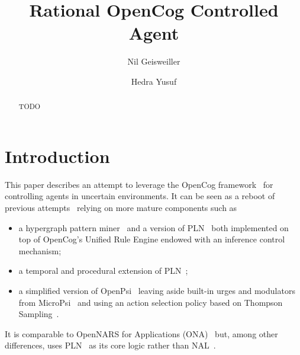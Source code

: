\documentclass[runningheads]{llncs}
\begin{document}
%
\title{Rational OpenCog Controlled Agent}

%
\author{Nil Geisweiller
  \and Hedra Yusuf}
%
%
%
\maketitle              %
%

\begin{abstract}
  TODO
\end{abstract}

\section{Introduction}

This paper describes an attempt to leverage the OpenCog
framework~\cite{Hart2008} for controlling agents in uncertain
environments.  It can be seen as a reboot of previous
attempts~\cite{Goertzel2008, Goertzel2011, Cai2011, Cai2013} relying
on more mature components such as
\begin{itemize}
\item a hypergraph pattern miner~\cite{Geisweiller2019} and a version
  of PLN~\cite{Goertzel2009} both implemented on top of OpenCog's
  Unified Rule Engine endowed with an inference control mechanism;
\item a temporal and procedural extension of
  PLN~\cite{Geisweiller2023TPLN};
\item a simplified version of OpenPsi~\cite{Cai2011, Cai2013} leaving
  aside built-in urges and modulators from MicroPsi~\cite{Bach2012}
  and using an action selection policy based on Thompson
  Sampling~\cite{Leike2016}.
\end{itemize}
It is comparable to OpenNARS for Applications (ONA)~\cite{Hammer2020}
but, among other differences, uses PLN~\cite{Goertzel2009} as its core
logic rather than NAL~\cite{Wang2011}.
\end{document}
